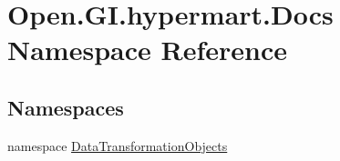 \hypertarget{namespace_open_1_1_g_i_1_1hypermart_1_1_docs}{}\section{Open.\+G\+I.\+hypermart.\+Docs Namespace Reference}
\label{namespace_open_1_1_g_i_1_1hypermart_1_1_docs}
\subsection*{Namespaces}
\begin{DoxyCompactItemize}
\item 
namespace \hyperlink{namespace_open_1_1_g_i_1_1hypermart_1_1_docs_1_1_data_transformation_objects}{Data\+Transformation\+Objects}
\end{DoxyCompactItemize}
